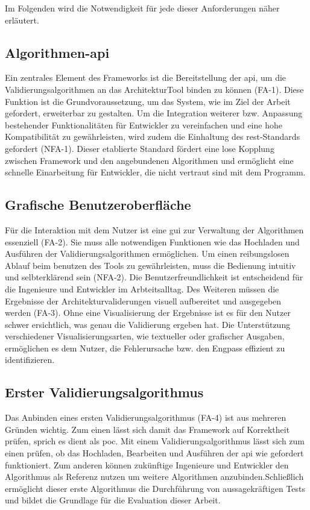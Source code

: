 Im Folgenden wird die Notwendigkeit für jede dieser Anforderungen näher erläutert.

\subsection*{Algorithmen-\gls{api}}

Ein zentrales Element des Frameworks ist die Bereitstellung der \gls{api}, um die Validierungsalgorithmen an das ArchitekturTool binden zu können (FA-1). Diese Funktion ist die Grundvoraussetzung, um das System, wie im Ziel der Arbeit gefordert, erweiterbar zu gestalten. Um die Integration weiterer bzw. Anpassung bestehender Funktionalitäten für Entwickler zu vereinfachen und eine hohe Kompatibilität zu gewährleisten, wird zudem die Einhaltung des \gls{rest}-Standards gefordert (NFA-1). Dieser etablierte Standard fördert eine lose Kopplung zwischen Framework und den angebundenen Algorithmen und ermöglicht eine schnelle Einarbeitung für Entwickler, die nicht vertraut sind mit dem Programm.

\subsection*{Grafische Benutzeroberfläche}

Für die Interaktion mit dem Nutzer ist eine \gls{gui} zur Verwaltung der Algorithmen essenziell (FA-2). Sie muss alle notwendigen Funktionen wie das Hochladen und Ausführen der Validierungsalgorithmen ermöglichen. Um einen reibungslosen Ablauf beim benutzen des Tools zu gewährleisten, muss die Bedienung intuitiv und selbterklärend sein (NFA-2). Die Benutzerfreundlichkeit ist entscheidend für die Ingenieure und Entwickler im Arbteitsalltag. Des Weiteren müssen die Ergebnisse der Architekturvaliderungen visuell aufbereitet und ausgegeben werden (FA-3). Ohne eine Visualisierung der Ergebnisse ist es für den Nutzer schwer ersichtlich, was genau die Validierung ergeben hat. Die Unterstützung verschiedener Visualisierungsarten, wie textueller oder grafischer Ausgaben, ermöglichen es dem Nutzer, die Fehlerursache bzw. den Engpass effizient zu identifizieren.

\subsection*{Erster Validierungsalgorithmus}

Das Anbinden eines ersten Validierungsalgorithmus (FA-4) ist aus mehreren Gründen wichtig. Zum einen lässt sich damit das Framework auf Korrektheit prüfen, sprich es dient als \gls{poc}. Mit einem Validierungsalgorithmus lässt sich zum einen prüfen, ob das Hochladen, Bearbeiten und Ausführen der \gls{api} wie gefordert funktioniert. Zum anderen können  zukünftige Ingenieure und Entwickler den Algorithmus als Referenz nutzen um weitere Algorithmen anzubinden.Schließlich ermöglicht dieser erste Algorithmus die Durchführung von aussagekräftigen Tests und bildet die Grundlage für die Evaluation dieser Arbeit.

